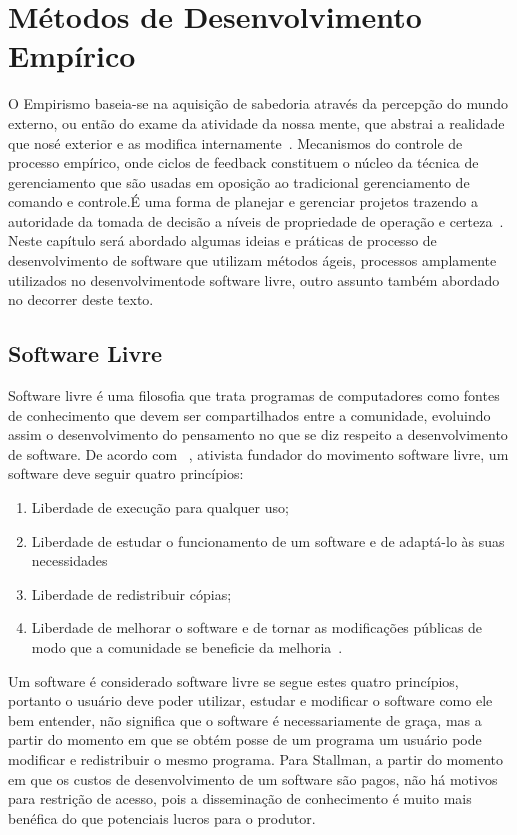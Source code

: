 
\chapter{Métodos de Desenvolvimento Empírico}
\label{cap:desenvolvimento-empirico}

O Empirismo baseia-se na aquisição de sabedoria através da percepção do mundo 
externo, ou então do exame da atividade da nossa mente, que abstrai a realidade 
que nosé exterior e as modifica internamente~\cite{chaui2003}.
%
Mecanismos do controle de processo empírico, onde ciclos de feedback constituem o
núcleo da técnica de gerenciamento que são usadas em oposição ao tradicional 
gerenciamento de comando e controle.É uma forma de planejar e gerenciar projetos 
trazendo a autoridade da tomada de decisão a níveis de propriedade de operação e 
certeza~\cite{Schwaber2004}.
%
Neste capítulo será abordado algumas ideias e práticas de processo de desenvolvimento
de software que utilizam métodos ágeis, processos amplamente utilizados no 
desenvolvimentode software livre, outro assunto também abordado no decorrer 
deste texto.
%
\section{Software Livre}

Software livre é uma filosofia que trata programas de computadores como fontes de 
conhecimento que devem ser compartilhados entre a comunidade, evoluindo assim o 
desenvolvimento do pensamento no que se diz respeito a desenvolvimento de software.
%
De acordo com ~, ativista fundador do movimento software livre, 
um software deve seguir quatro princípios:
%
\begin{enumerate}
\item Liberdade de execução para qualquer uso;
\item Liberdade de estudar o funcionamento de um software e de adaptá-lo às suas 
necessidades
\item Liberdade de redistribuir cópias;
\item Liberdade de melhorar o software e de tornar as modificações públicas de modo 
que a comunidade se beneficie da melhoria~\cite{stallman2001}.
\end{enumerate}
%
Um software é considerado software livre se segue estes quatro princípios, portanto 
o usuário deve poder utilizar, estudar e modificar o software como ele bem entender, 
não significa que o software é necessariamente de graça, mas a partir do momento em 
que se obtém posse de um programa um usuário pode modificar e redistribuir o mesmo 
programa.
%
Para Stallman, a partir do momento em que os custos de desenvolvimento de um software 
são pagos, não há motivos para restrição de acesso, pois a disseminação de conhecimento 
é muito mais benéfica do que potenciais lucros para o produtor.
%

